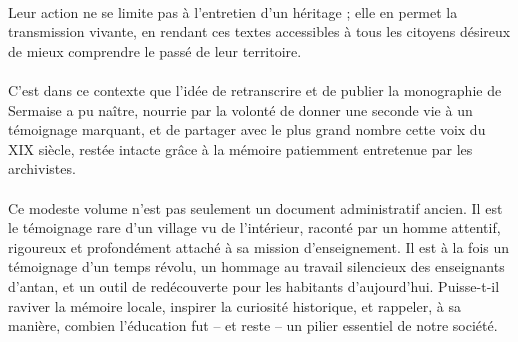 \documentclass[../eBook.tex]{subfiles}
\begin{document}
    \paragraph{}Leur action ne se limite pas à l'entretien d'un héritage ; elle en permet la transmission vivante, en rendant ces textes accessibles à tous les citoyens désireux de mieux comprendre le passé de leur territoire.
    \paragraph{}C'est dans ce contexte que l'idée de retranscrire et de publier la monographie de Sermaise a pu naître, nourrie par la volonté de donner une seconde vie à un témoignage marquant, et de partager avec le plus grand nombre cette voix du XIX siècle, restée intacte grâce à la mémoire patiemment entretenue par les archivistes.
    \paragraph{}Ce modeste volume n'est pas seulement un document administratif ancien. Il est le témoignage rare d'un village vu de l'intérieur, raconté par un homme attentif, rigoureux et profondément attaché à sa mission d'enseignement. Il est à la fois un témoignage d'un temps révolu, un hommage au travail silencieux des enseignants d'antan, et un outil de redécouverte pour les habitants d'aujourd'hui. Puisse-t-il raviver la mémoire locale, inspirer la curiosité historique, et rappeler, à sa manière, combien l'éducation fut -- et reste -- un pilier essentiel de notre société.
\end{document}
